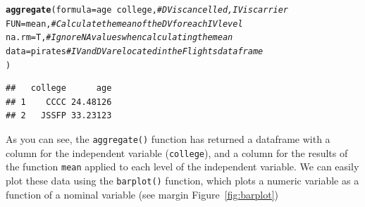 \documentclass{tufte-book}\usepackage[]{graphicx}\usepackage[]{color}
\makeatletter
\newcommand{\hlcom}[1]{\textcolor[rgb]{0.678,0.584,0.686}{\textit{#1}}}%
\newcommand{\hlopt}[1]{\textcolor[rgb]{0,0,0}{#1}}%
\newcommand{\hlstd}[1]{\textcolor[rgb]{0.345,0.345,0.345}{#1}}%
\newcommand{\hlkwc}[1]{\textcolor[rgb]{0.333,0.667,0.333}{#1}}%
\newcommand{\hlkwd}[1]{\textcolor[rgb]{0.737,0.353,0.396}{\textbf{#1}}}%
\newenvironment{kframe}{%
 \def\at@end@of@kframe{}%
 \ifinner\ifhmode%
  \def\at@end@of@kframe{\end{minipage}}%
  \begin{minipage}{\columnwidth}%
 \fi\fi%
 \def\FrameCommand##1{\hskip\@totalleftmargin \hskip-\fboxsep
 \colorbox{shadecolor}{##1}\hskip-\fboxsep
     \hskip-\linewidth \hskip-\@totalleftmargin \hskip\columnwidth}%
 \MakeFramed {\advance\hsize-\width
   \@totalleftmargin\z@ \linewidth\hsize
   \@setminipage}}%
 {\par\unskip\endMakeFramed%
 \at@end@of@kframe}
\newenvironment{knitrout}{}{} %
\makeatother
\begin{document}
\begin{footnotesize}
\begin{knitrout}
\color{fgcolor}\begin{kframe}
\begin{alltt}
\hlkwd{aggregate}\hlstd{(}\hlkwc{formula} \hlstd{= age} \hlopt{~} \hlstd{college,}  \hlcom{# DV is cancelled, IV is carrier}
          \hlkwc{FUN} \hlstd{= mean,} \hlcom{# Calculate the mean of the DV for each IV level}
          \hlkwc{na.rm} \hlstd{= T,} \hlcom{# Ignore NA values when calculating the mean}
          \hlkwc{data} \hlstd{= pirates} \hlcom{# IV and DV are located in the Flights dataframe}
          \hlstd{)}
\end{alltt}
\begin{verbatim}
##   college      age
## 1    CCCC 24.48126
## 2   JSSFP 33.23123
\end{verbatim}
\end{kframe}
\end{knitrout}
\end{footnotesize}

As you can see, the \texttt{aggregate()} function has returned a dataframe with a column for the independent variable (\texttt{college}), and a column for the results of the function \texttt{mean} applied to each level of the independent variable. We can easily plot these data using the \texttt{barplot()} function, which plots a numeric variable as a function of a nominal variable (see margin Figure~\ref{fig:barplot})
\end{document}

